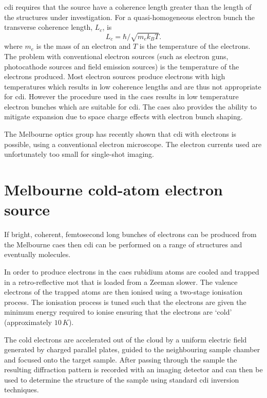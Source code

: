\Gls{cdi} requires that the source have a coherence length greater than the length of the structures under investigation. For a quasi-homogeneous electron bunch the transverse coherence length, $L_c$, is\cite{van_oudheusden_electron_2007}
\begin{equation}
L_c = \hbar/\sqrt{m_e k_B T}.
\end{equation}
where $m_e$ is the mass of an electron and $T$ is the temperature of the electrons. The problem with conventional electron sources (such as electron guns, photocathode sources and field emission sources) is the temperature of the electrons produced. Most electron sources produce electrons with high temperatures which results in low coherence lengths and are thus not appropriate for \gls{cdi}. However the procedure used in the \gls{caes} results in low temperature electron bunches which are suitable for \gls{cdi}. The \gls{caes} also provides the ability to mitigate expansion due to space charge effects with electron bunch shaping\cite{mcculloch_arbitrarily_2011}.

The Melbourne optics group has recently shown that \gls{cdi} with electrons is possible, using a conventional electron microscope\cite{putkunz_atom-scale_2012}. The electron currents used are unfortunately too small for single-shot imaging.

\section{Melbourne cold-atom electron source}

If bright, coherent, femtosecond long bunches of electrons can be produced from the Melbourne \gls{caes} then \gls{cdi} can be performed on a range of structures and eventually molecules.

In order to produce electrons in the \gls{caes} rubidium atoms are cooled and trapped in a retro-reflective \gls{mot} that is loaded from a Zeeman slower\cite{phillips_laser_1982, phillips_cooling_1987, bell_slow_2010}. The valence electrons of the trapped atoms are then ionised using a two-stage ionisation process. The ionisation process is tuned such that the electrons are given the minimum energy required to ionise ensuring that the electrons are `cold' (approximately $10\,\unit{K}$\cite{mcculloch_arbitrarily_2011}).

The cold electrons are accelerated out of the cloud by a uniform electric field generated by charged parallel plates, guided to the neighbouring sample chamber and focused onto the target sample. After passing through the sample the resulting diffraction pattern is recorded with an imaging detector and can then be used to determine the structure of the sample using standard \gls{cdi} inversion techniques.

